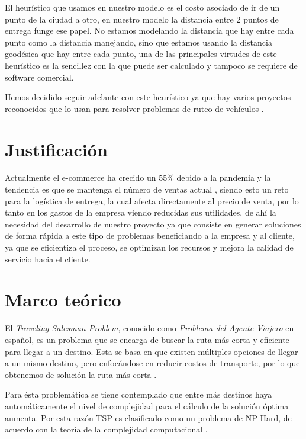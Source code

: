 \documentclass[journal]{IEEEtran}
\begin{document}
        El heurístico que usamos en nuestro modelo es el costo asociado de ir de un punto de la ciudad a otro, en nuestro modelo la distancia entre 2 puntos de entrega funge ese papel. No estamos modelando la distancia que hay entre cada punto como la distancia manejando, sino que estamos usando la distancia geodésica que hay entre cada punto, una de las principales virtudes de este heurístico es la sencillez con la que puede ser calculado y tampoco se requiere de software comercial. 
        
        Hemos decidido seguir adelante con este heurístico ya que hay varios proyectos reconocidos que lo usan para resolver problemas de ruteo de vehículos \cite{ERDOGAN201762}.

    \section{Justificación} \label{sec:justification}

        Actualmente el e-commerce ha crecido un 55\% debido a la pandemia y la tendencia es que se mantenga el número de ventas actual \cite{koetsier-2022}, siendo esto un reto para la logística de entrega, la cual afecta directamente al precio de venta, por lo tanto en los gastos de la empresa viendo reducidas sus utilidades, de ahí la necesidad del desarrollo de nuestro proyecto ya que consiste en generar soluciones de forma rápida a este tipo de problemas beneficiando a la empresa y al cliente, ya que se eficientiza el proceso, se optimizan los recursos y mejora la calidad de servicio hacia el cliente.

    \section{Marco teórico} \label{sec:theoretical}
    
        El \emph{Traveling Salesman Problem}, conocido como \emph{Problema del Agente Viajero} en español, es un problema que se encarga de buscar la ruta más corta y eficiente para llegar a un destino. Esta se basa en que existen múltiples opciones de llegar a un mismo destino, pero enfocándose en reducir costos de transporte, por lo que obtenemos de solución la ruta más corta \cite{trevelingProb}.

        Para ésta problemática se tiene contemplado que entre más destinos haya automáticamente el nivel de complejidad para el cálculo de la solución óptima aumenta. Por esta razón TSP es clasificado como un problema de NP-Hard, de acuerdo con la teoría de la complejidad computacional \cite{trevelingProb}.
\end{document}

